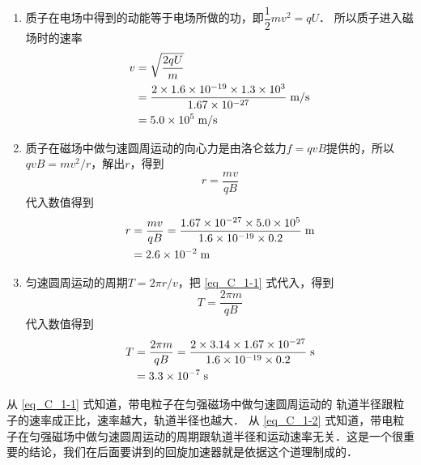 \begin{solution}
    \begin{enumerate}
        \item 质子在电场中得到的动能等于电场所做的功，即$\dfrac{1}{2}mv^2=qU$．
        所以质子进入磁场时的速率
        \[\begin{split}
            v&=\sqrt{\frac{2qU}{m}}\\
            &=\frac{2\times 1.6\times 10^{-19}\times1.3\times10^3}{1.67\times 10^{-27}}\;\text{m}/\text{s}\\
            &=5.0\times 10^5\;\text{m}/\text{s}
        \end{split}\]
        \item 质子在磁场中做匀速圆周运动的向心力是由洛仑兹力$f=qvB$提供的，所以$qvB=mv^2/r$，解出$r$，得到
        \begin{equation}\label{eq_C_1-1}
            r=\frac{mv}{qB}
        \end{equation}
        代入数值得到
       \[\begin{split}
           r&=\frac{mv}{qB}=\frac{1.67\times 10^{-27}\times 5.0\times 10^5}{1.6\times 10^{-19}\times 0.2} \;\text{m} \\
           &=2.6\times 10^{-2} \;\text{m} 
       \end{split}\]
        
        
        \item 匀速圆周运动的周期$T=2\pi r/v$，把 \eqref{eq_C_1-1} 式代入，得到
\begin{equation}\label{eq_C_1-2}
    T=\frac{2\pi m}{qB}
\end{equation}
        代入数值得到
        \[\begin{split}
            T&=\frac{2\pi m}{qB}=\frac{2\times 3.14\times 1.67\times 10^{-27}}{1.6\times 10^{-19}\times 0.2} \;\text{s} \\
            &=3.3\times 10^{-7} \;\text{s} 
        \end{split}\]
    \end{enumerate}
\end{solution}

从 \eqref{eq_C_1-1} 式知道，带电粒子在匀强磁场中做匀速圆周运动的
轨道半径跟粒子的速率成正比，速率越大，轨道半径也越大．
从 \eqref{eq_C_1-2} 式知道，带电粒子在匀强磁场中做匀速圆周运动的周期跟轨道半径和运动速率无关．这是一个很重要的结论，我们在后面要讲到的回旋加速器就是依据这个道理制成的．
        
